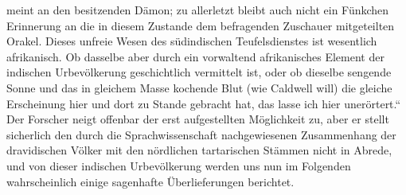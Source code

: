\documentclass{article}
\begin{document}
meint an den besitzenden Dämon; zu allerletzt bleibt auch nicht ein Fünkchen Erinnerung an die in diesem Zustande dem befragenden Zuschauer mitgeteilten Orakel. Dieses unfreie Wesen des südindischen Teufelsdienstes ist wesentlich afrikanisch. Ob dasselbe aber durch ein vorwaltend afrikanisches Element der indischen Urbevölkerung geschichtlich vermittelt ist, oder ob dieselbe sengende Sonne und das in gleichem Masse kochende Blut (wie Caldwell will) die gleiche Erscheinung hier und dort zu Stande gebracht hat, das lasse ich hier unerörtert.“ Der Forscher neigt offenbar der erst aufgestellten Möglichkeit zu, aber er stellt sicherlich den durch die Sprachwissenschaft nachgewiesenen Zusammenhang der dravidischen Völker mit den nördlichen tartarischen Stämmen nicht in Abrede, und von dieser indischen Urbevölkerung werden uns nun im Folgenden wahrscheinlich einige sagenhafte Überlieferungen berichtet.

\begin{center}
\end{center}
\end{document}
